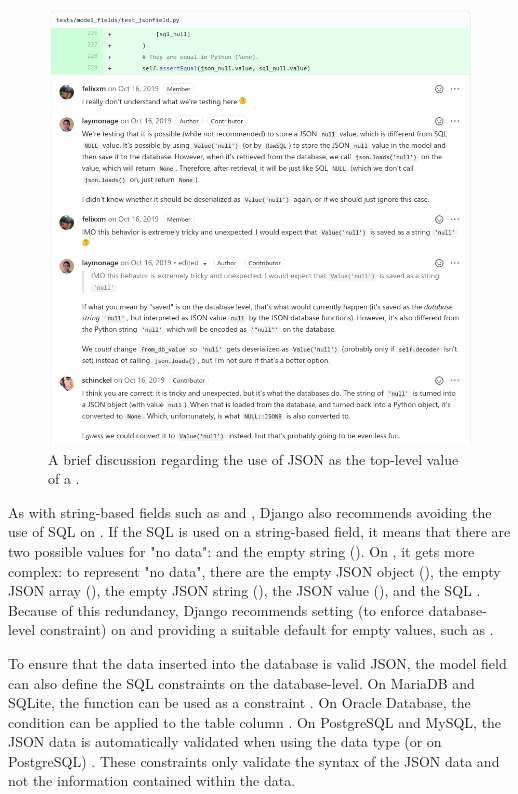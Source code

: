 \begin{figure}
	\centering
    \includegraphics[width=1.0\textwidth]{pics/null_discussion.png}
	\caption{A brief discussion regarding the use of JSON  as the
	top-level value of a .}
	\label{fig:nulldiscussion}
\end{figure}

As with string-based fields such as  and ,
Django also recommends avoiding the use of SQL  on 
\cite{django:model_fields}. If the SQL  is used on a string-based
field, it means that there are two possible values for "no data": 
and the empty string (). On , it gets more complex:
to represent "no data", there are the empty JSON object (), the
empty JSON array (), the empty JSON string (), the JSON
 value (), and the SQL . Because of this
redundancy, Django recommends setting  (to enforce
database-level  constraint) on  and providing
a suitable default for empty values, such as .

To ensure that the data inserted into the database is valid JSON, the model
field can also define the SQL  constraints on the database-level.
On MariaDB and SQLite, the  function can be used as a
 constraint \cite{mariadb:json_valid, sqlite:json1}. On Oracle
Database, the  condition can be applied to the table column
\cite{oracle:is_json}. On PostgreSQL and MySQL, the JSON data is automatically
validated when using the  data type (or  on PostgreSQL)
\cite{postgres:json, mysql:json}. These constraints only validate the syntax of
the JSON data and not the information contained within the data.

